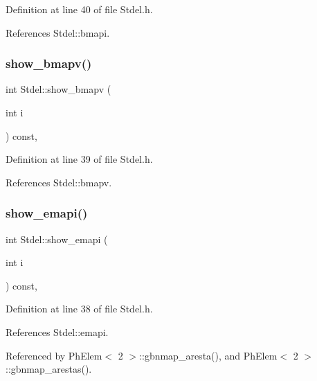 Definition at line 40 of file Stdel.\+h.



References Stdel\+::bmapi.

\mbox{\label{classStdel_ac8787dabfb1d767b89e39806522c1161}} 
\subsubsection{\texorpdfstring{show\+\_\+bmapv()}{show\_bmapv()}}
{\footnotesize\ttfamily int Stdel\+::show\+\_\+bmapv (\begin{DoxyParamCaption}\item[{int}]{i }\end{DoxyParamCaption}) const\hspace{0.3cm}{\ttfamily [inline]}, {\ttfamily [inherited]}}



Definition at line 39 of file Stdel.\+h.



References Stdel\+::bmapv.

\mbox{\label{classStdel_aca7fb885191a952c013e930521a42213}} 
\subsubsection{\texorpdfstring{show\+\_\+emapi()}{show\_emapi()}}
{\footnotesize\ttfamily int Stdel\+::show\+\_\+emapi (\begin{DoxyParamCaption}\item[{int}]{i }\end{DoxyParamCaption}) const\hspace{0.3cm}{\ttfamily [inline]}, {\ttfamily [inherited]}}



Definition at line 38 of file Stdel.\+h.



References Stdel\+::emapi.



Referenced by Ph\+Elem$<$ 2 $>$\+::gbnmap\+\_\+aresta(), and Ph\+Elem$<$ 2 $>$\+::gbnmap\+\_\+arestas().

